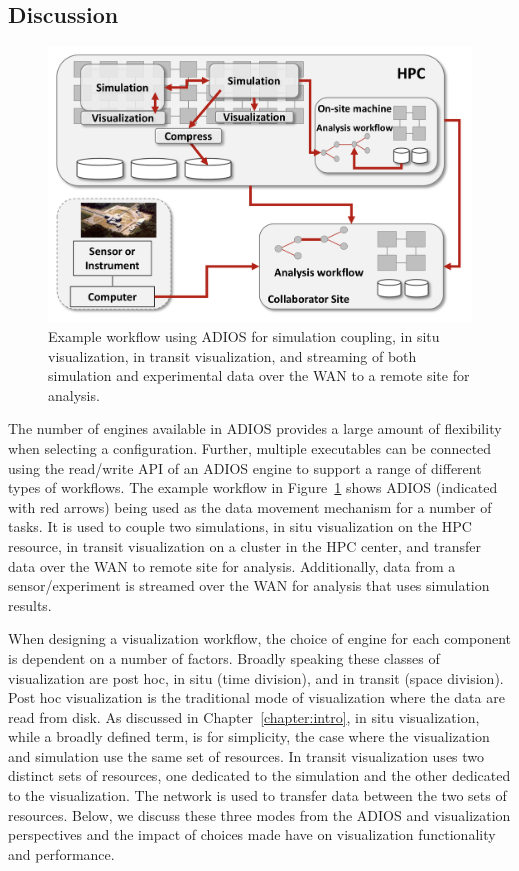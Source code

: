 \subsection{Discussion}
\label{sec:adios:discussion}

\begin{figure}[t]
\sidecaption
\includegraphics[width=1\linewidth]{figures/ADIOS_workflow.png}
\caption{Example workflow using ADIOS for simulation coupling, in situ visualization, in transit visualization, and streaming of both simulation and experimental data over the WAN to a remote site for analysis.}
\label{fig:example_workflow}
\end{figure}

The number of engines available in ADIOS provides a large amount of flexibility when selecting a configuration. Further, multiple executables can be connected using the read/write API of an ADIOS engine to support a range of different types of workflows. The example workflow in Figure~\ref{fig:example_workflow} shows ADIOS (indicated with red arrows) being used as the data movement mechanism for a number of tasks. It is used to couple two simulations, in situ visualization on the HPC resource, in transit visualization on a cluster in the HPC center, and transfer data over the WAN to remote site for analysis. Additionally, data from a sensor/experiment is streamed over the WAN for analysis that uses simulation results.

When designing a visualization workflow, the choice of engine for each component is dependent on a number of factors. Broadly speaking these classes of visualization are post hoc, in situ (time division), and in transit (space division). Post hoc visualization is the traditional mode of visualization where the data are read from disk. As discussed in Chapter~\ref{chapter:intro}, in situ visualization, while a broadly defined term, is for simplicity, the case where the visualization and simulation use the same set of resources. In transit visualization uses two distinct sets of resources, one dedicated to the simulation and the other dedicated to the visualization. The network is used to transfer data between the two sets of resources. Below, we discuss these three modes from the ADIOS and visualization perspectives and the impact of choices made have on visualization functionality and performance.

